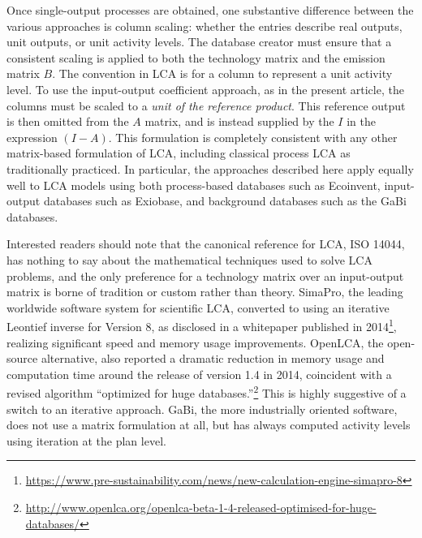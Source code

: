    Once single-output processes are obtained, one substantive difference between the various approaches is column scaling: whether the entries describe real outputs, unit outputs, or unit activity levels.  The database creator must ensure that a consistent scaling is applied to both the technology matrix and the emission matrix $B$.  The convention in LCA is for a column to represent a unit activity level.  To use the input-output coefficient approach, as in the present article, the columns must be scaled to a \textit{unit of the reference product}.  This reference output is then omitted from the $A$ matrix, and is instead supplied by the $I$ in the expression $(I-A)$.  This formulation is completely consistent with any other matrix-based formulation of LCA, including classical process LCA as traditionally practiced.  In particular, the approaches described here apply equally well to LCA models using both process-based databases such as Ecoinvent, input-output databases such as Exiobase, and background databases such as the GaBi databases.

   Interested readers should note that the canonical reference for LCA, ISO 14044, has nothing to say about the mathematical techniques used to solve LCA problems, and the only preference for a technology matrix over an input-output matrix is borne of tradition or custom rather than theory.  SimaPro, the leading worldwide software system for scientific LCA, converted to using an iterative Leontief inverse for Version 8, as disclosed in a whitepaper published in 2014\footnote{\url{https://www.pre-sustainability.com/news/new-calculation-engine-simapro-8}}, realizing significant speed and memory usage improvements.  OpenLCA, the open-source alternative, also reported a dramatic reduction in memory usage and computation time around the release of version 1.4 in 2014, coincident with a revised algorithm ``optimized for huge databases.''\footnote{\url{http://www.openlca.org/openlca-beta-1-4-released-optimised-for-huge-databases/}} This is highly suggestive of a switch to an iterative approach.  GaBi, the more industrially oriented software, does not use a matrix formulation at all, but has always computed activity levels using iteration at the plan level.
